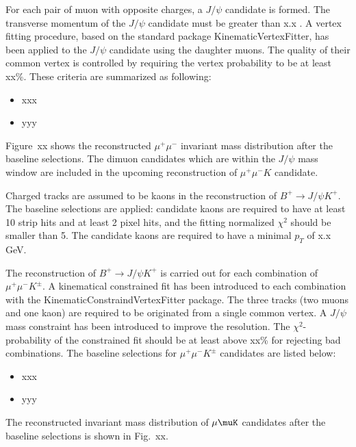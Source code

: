 For each pair of muon with opposite charges, a $J/\psi$ candidate is formed. 
The transverse momentum of the $J/\psi$ candidate must be greater than x.x \GeVc. %
A vertex fitting procedure, based on the standard package KinematicVertexFitter, has been applied to the $J/\psi$ candidate using the daughter muons. The quality of their common vertex is controlled by requiring 
the vertex probability to be at least xx\%. These criteria are summarized as following:
\begin{itemize}
\item xxx %
\item yyy
\end{itemize}

Figure~xx shows the reconstructed $\mu^+\mu^-$ invariant mass distribution after the baseline selections.
The dimuon candidates which are within the $J/\psi$ mass window are included in the upcoming reconstruction of $\mu^+\mu^-K$ candidate. 

Charged tracks are assumed to be kaons in the reconstruction of $B^+ \to J/\psi K^+$.
The baseline selections are applied:
candidate kaons are required to have at least 10 strip hits and at least 2 pixel hits,
and the fitting normalized $\chi{}^{2}$ should be smaller than 5. 
The candidate kaons are required to have a minimal $p_{T}$ of x.x GeV.

The reconstruction of $B^+ \to J/\psi K^+$ is carried out for each combination of $\mu^+\mu^- K^\pm$.
A kinematical constrained fit has been introduced to each combination with the KinematicConstraindVertexFitter package. 
The three tracks (two muons and one kaon) are required to be originated from a single common vertex.
A $J/\psi$ mass constraint has been introduced to improve the resolution. 
The $\chi^2$-probability of the constrained fit should be at least above xx\% for rejecting bad combinations. 
The baseline selections for $\mu^+\mu^- K^\pm$ candidates are listed below:
\begin{itemize}
\item xxx %
\item yyy
\end{itemize}

The reconstructed invariant mass distribution of $\mu\muK$ candidates after the baseline selections is shown in Fig.~xx.

